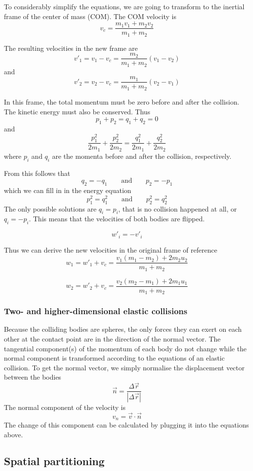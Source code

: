 To considerably simplify the equations, we are going to transform to the 
inertial frame of the center of mass (COM). The COM velocity is
$$
v_c = \frac{m_1 v_1 + m_2 v_2}{m_1 + m_2}
$$

The resulting velocities in the new frame are
$$
v'_1 = v_1 - v_c = \frac{m_2}{m_1+m_2}(v_1-v_2)
$$
and
$$
v'_2 = v_2 - v_c = \frac{m_1}{m_1+m_2}(v_2-v_1)
$$

In this frame, the total momentum must be zero before and after the collision.  
The kinetic energy must also be conserved.
Thus
$$
p_1 + p_2 = q_1 + q_2 = 0
$$
and
$$
\frac{p_1^2}{2m_1} + \frac{p_2^2}{2m_2} = \frac{q_1^2}{2m_1} + 
\frac{q_2^2}{2m_2}
$$
where $p_i$ and $q_i$ are the momenta before and after the collision, 
respectively.

From this follows that
$$
q_2 = -q_1 \qquad \textrm{and} \qquad p_2 = -p_1
$$
which we can fill in in the energy equation
$$
p_1^2 = q_1^2 \qquad \textrm{and} \qquad p_2^2 = q_2^2
$$
The only possible solutions are $q_i = p_i$, that is no collision happened at 
all, or $q_i = -p_i$. This means that the velocities of both bodies are 
flipped.

$$
w'_i = -v'_i
$$

Thus we can derive the new velocities in the original frame of reference
$$
w_1 = w'_1 + v_c = \frac{v_1(m_1-m_2) + 2m_2u_2}{m_1+m_2}
$$

$$
w_2 = w'_2 + v_c = \frac{v_2(m_2-m_1) + 2m_1u_1}{m_1+m_2}
$$

\subsubsection{Two- and higher-dimensional elastic collisions}
Because the colliding bodies are spheres, the only forces they can exert on 
each other at the contact point are in the direction of the normal vector. The 
tangential component(s) of the momentum of each body do not change while the 
normal component is transformed according to the equations of an elastic 
collision. To get the normal vector, we simply normalise the displacement 
vector between the bodies
$$
\vec{n} = \frac{\Delta\vec{r}}{|\Delta\vec{r}|}
$$
The normal component of the velocity is
$$
v_n = \vec{v} \cdot \vec{n}
$$
The change of this component can be calculated by plugging it into the 
equations above.

\subsection{Spatial partitioning}

